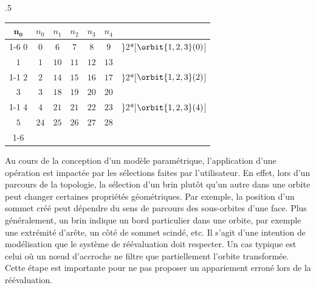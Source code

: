\begin{table}[htb!]
\begin{subtable}[t]{.5\textwidth}
\begin{tabular}{|c||c|c|c|c|c|l@{\,}}
			\(\mathbf{n_{0}}\) & \(n_{0}\) & \(n_{1}\) & \(n_{2}\)                        & \(n_{3}\)                        & \(n_{4}\)                        &                                                   \\
			\cline{1-6}%
			\addlinespace[2pt]
			\cline{1-6}%
			\(0\)              & \(0\)     & \(6\)     & \textcolor{mydarkorange}{\(7\)}  & \textcolor{mydarkorange}{\(8\)}  & \textcolor{mydarkorange}{\(9\)}  & \rdelim\}{2}{*}[\hspace{2pt}\(\orbit{1,2,3}(0)\)] \\
			\(1\)              & \(1\)     & \(10\)    & \textcolor{mydarkorange}{\(11\)} & \textcolor{mydarkorange}{\(12\)} & \textcolor{mydarkorange}{\(13\)} &                                                   \\
			\cline{1-1} \cline{4-6}%
			\(2\)              & \(2\)     & \(14\)    & \textcolor{mydarkorange}{\(15\)} & \textcolor{mydarkorange}{\(16\)} & \textcolor{mydarkorange}{\(17\)} & \rdelim\}{2}{*}[\hspace{2pt}\(\orbit{1,2,3}(2)\)] \\
			\(3\)              & \(3\)     & \(18\)    & \textcolor{mydarkorange}{\(19\)} & \textcolor{mydarkorange}{\(20\)} & \textcolor{mydarkorange}{\(20\)} &                                                   \\
			\cline{1-1} \cline{4-6}%
			\(4\)              & \(4\)     & \(21\)    & \textcolor{mydarkorange}{\(21\)} & \textcolor{mydarkorange}{\(22\)} & \textcolor{mydarkorange}{\(23\)} & \rdelim\}{2}{*}[\hspace{2pt}\(\orbit{1,2,3}(4)\)] \\
			\(5\)              & \(24\)    & \(25\)    & \textcolor{mydarkorange}{\(26\)} & \textcolor{mydarkorange}{\(27\)} & \textcolor{mydarkorange}{\(28\)} &                                                   \\
			\cline{1-6}%
		\end{tabular}
	\end{subtable}
\end{table}


Au cours de la conception d'un modèle paramétrique, l'application d'une
opération est impactée par les sélections faites par l'utilisateur. %
En effet, lors d'un parcours de la topologie, la sélection d'un brin plutôt
qu'un autre dans une orbite peut changer certaines propriétés géométriques. %
Par exemple, la position d'un sommet créé peut dépendre du sens de parcours des
sous-orbites d'une face. %
Plus généralement, un brin indique un bord particulier dans une orbite, par
exemple une extrémité d'arête, un côté de sommet scindé, etc. %
Il s'agit d'une intention de modélisation que le système de réévaluation doit
respecter. %
Un cas typique est celui où un n\oe ud d'accroche ne filtre que partiellement
l'orbite transformée.  %
Cette étape est importante pour ne pas proposer un appariement erroné lors de la
réévaluation. %

